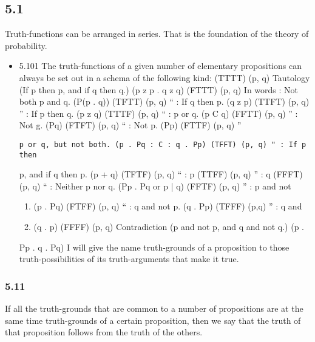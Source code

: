 \documentclass[11pt]{article}
\begin{document}
\subsection*{5.1}
\label{sec:orgcf2fddc}
Truth-functions can be arranged in series. That is the foundation of
the theory of probability.
\begin{itemize}
\item 5.101
\label{sec:orgc9f80b6}
The truth-functions of a given number of elementary propositions can
always be set out in a schema of the following kind: (TTTT) (p, q)
Tautology (If p then p, and if q then q.) (p z p . q z q) (FTTT) (p, q) In
words : Not both p and q. (P(p . q)) (TFTT) (p, q) `` : If q then p. (q z p)
(TTFT) (p, q) '' : If p then q. (p z q) (TTTF) (p, q) `` : p or q. (p C q)
(FFTT) (p, q) '' : Not g. (Pq) (FTFT) (p, q) `` : Not p. (Pp) (FTTF) (p, q) ''
\begin{verbatim}
p or q, but not both. (p . Pq : C : q . Pp) (TFFT) (p, q) " : If p then
\end{verbatim}

p, and if q then p. (p + q) (TFTF) (p, q) `` : p (TTFF) (p, q) '' : q (FFFT)
(p, q) `` : Neither p nor q. (Pp . Pq or p | q) (FFTF) (p, q) '' : p and not
\begin{enumerate}
\item (p . Pq) (FTFF) (p, q) `` : q and not p. (q . Pp) (TFFF) (p,q) '' : q and
\item (q . p) (FFFF) (p, q) Contradiction (p and not p, and q and not q.) (p .
\end{enumerate}
Pp . q . Pq) I will give the name truth-grounds of a proposition to those
truth-possibilities of its truth-arguments that make it true.
\end{itemize}
\subsubsection*{5.11}
\label{sec:org29217b1}
If all the truth-grounds that are common to a number of propositions
are at the same time truth-grounds of a certain proposition, then we say
that the truth of that proposition follows from the truth of the others.
\end{document}
